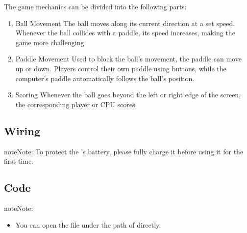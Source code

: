 \documentclass[a4paper,11pt,english]{sphinxmanual}
\begin{document}
\sphinxAtStartPar
The game mechanics can be divided into the following parts:
\begin{enumerate}
%
\item {} 
\sphinxAtStartPar
Ball Movement \sphinxhyphen{} The ball moves along its current direction at a set speed. Whenever the ball collides with a paddle, its speed increases, making the game more challenging.

\item {} 
\sphinxAtStartPar
Paddle Movement \sphinxhyphen{} Used to block the ball’s movement, the paddle can move up or down. Players control their own paddle using buttons, while the computer’s paddle automatically follows the ball’s position.

\item {} 
\sphinxAtStartPar
Scoring \sphinxhyphen{} Whenever the ball goes beyond the left or right edge of the screen, the corresponding player or CPU scores.

\end{enumerate}


\subsection{Wiring}
\label{\detokenize{Extension_Project/Ping-Pong_Game:wiring}}
\begin{sphinxadmonition}{note}{Note:}
\sphinxAtStartPar
To protect the ’s battery, please fully charge it before using it for the first time.
\end{sphinxadmonition}


\sphinxAtStartPar
{}



\subsection{Code}
\label{\detokenize{Extension_Project/Ping-Pong_Game:code}}
\begin{sphinxadmonition}{note}{Note:}\begin{itemize}
\item {} 
\sphinxAtStartPar
You can open the file  under the path of  directly.

\end{itemize}
\end{sphinxadmonition}
\end{document}
